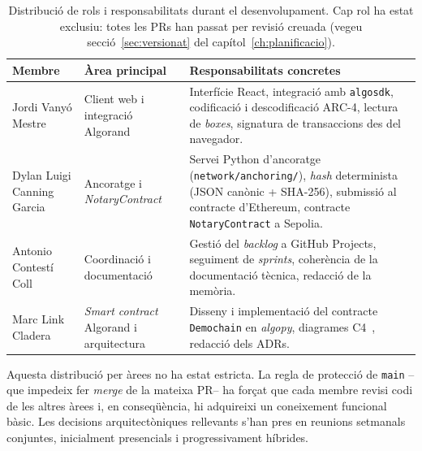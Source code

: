 \begin{table}[ht]
    \centering
    \small
    \begin{tabular}{@{}p{3.3cm}p{4cm}p{5cm}@{}}
        \toprule
        \textbf{Membre}            & \textbf{Àrea principal}                       & \textbf{Responsabilitats concretes}                                                                                                                                                                            \\
        \midrule
        Jordi Vanyó Mestre         & Client web i integració Algorand              & Interfície React, integració amb \texttt{algosdk}, codificació i descodificació \ac{ARC}-4, lectura de \emph{boxes}, signatura de transaccions des del navegador.                                              \\
        \addlinespace
        Dylan Luigi Canning Garcia & Ancoratge i \emph{NotaryContract}             & Servei Python d'ancoratge (\texttt{network/anchoring/}), \emph{\textit{hash}} determinista (\ac{JSON} canònic + \ac{SHA}-256), submissió al contracte d'Ethereum, contracte \texttt{NotaryContract} a Sepolia. \\
        \addlinespace
        Antonio Contestí Coll      & Coordinació i documentació                    & Gestió del \emph{backlog} a GitHub Projects, seguiment de \emph{sprints}, coherència de la documentació tècnica, redacció de la memòria.                                                                       \\
        \addlinespace
        Marc Link Cladera          & \emph{Smart contract} Algorand i arquitectura & Disseny i implementació del contracte \texttt{Demochain} en \emph{algopy}, diagrames C4~\cite{brown2018c4}, redacció dels \acp{ADR}.                                                                           \\
        \bottomrule
    \end{tabular}
    \caption[Rols i responsabilitats]{Distribució de rols i responsabilitats
    durant el desenvolupament.
    Cap rol ha estat exclusiu: totes les \acsp{PR} han passat per revisió creuada (vegeu secció~\ref{sec:versionat} del
    capítol~\ref{ch:planificacio}).}
    \label{tab:rols-desenv}
\end{table}

Aquesta distribució per àrees no ha estat estricta.
La regla de protecció de \texttt{main} --que impedeix fer \emph{merge} de la mateixa \ac{PR}-- ha forçat que cada membre
revisi codi de les altres àrees i, en conseqüència, hi adquireixi un coneixement funcional bàsic.
Les decisions arquitectòniques rellevants s'han pres en reunions setmanals conjuntes, inicialment presencials i
progressivament híbrides.

